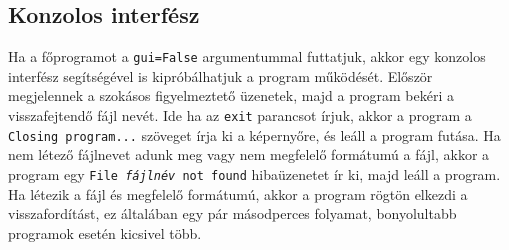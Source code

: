 \subsection{Konzolos interfész}
Ha a főprogramot a \texttt{\-\-gui=False} argumentummal futtatjuk, akkor egy
konzolos interfész segítségével is kipróbálhatjuk a program működését. Először
megjelennek a szokásos figyelmeztető üzenetek, majd a program bekéri
a visszafejtendő fájl nevét. Ide ha az \texttt{exit} parancsot írjuk, akkor
a program a \texttt{Closing program...} szöveget írja ki a képernyőre, és
leáll a program futása. Ha nem létező fájlnevet adunk meg vagy nem megfelelő
formátumú a fájl, akkor a program egy
\texttt{File \textit{fájlnév} not found} hibaüzenetet ír ki, majd leáll a program.
Ha létezik a fájl és megfelelő formátumú,
akkor a program rögtön elkezdi a visszafordítást, ez általában egy pár
másodperces folyamat, bonyolultabb programok esetén kicsivel több.

